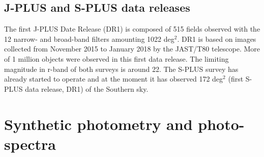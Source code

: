 \documentclass{article}
\begin{document}
  


\subsection{J-PLUS and S-PLUS data releases}
\label{sec:dr}

 The first J-PLUS Date Release  (DR1) is composed of 515 fields observed with the 12 narrow- and broad-band filters amounting 1022 deg$^2$. DR1 is based on images collected from November 2015 to January 2018 by the JAST/T80 telescope. More of  1 million objects were observed in this first data release. The limiting magnitude in r-band of both surveys is around 22. The S-PLUS survey has already started to operate and at the moment it has observed 172 deg$^2$ (first S-PLUS data release, DR1) of the Southern sky.


\section{ Synthetic photometry and photo-spectra}
\label{chap:meto}


\end{document}
